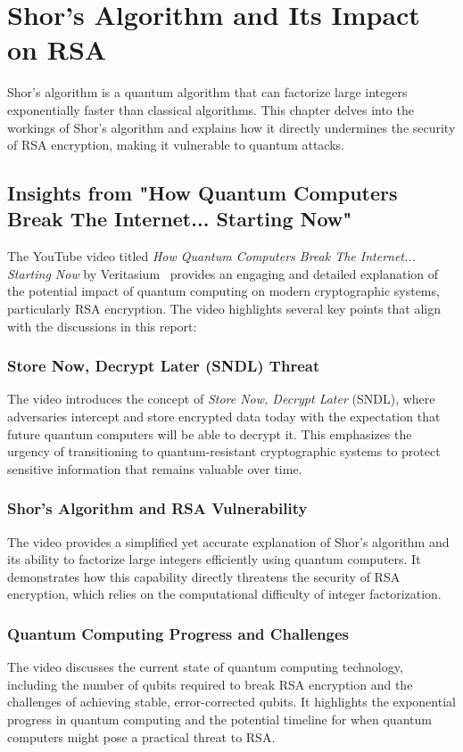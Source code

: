 \documentclass[12pt,a4paper]{report}
\begin{document}
\chapter{Shor's Algorithm and Its Impact on RSA}
\label{chap:shors_algorithm}
Shor's algorithm is a quantum algorithm that can factorize large integers exponentially faster than classical algorithms. This chapter delves into the workings of Shor's algorithm and explains how it directly undermines the security of RSA encryption, making it vulnerable to quantum attacks.

\section{Insights from "How Quantum Computers Break The Internet... Starting Now"}
The YouTube video titled \textit{How Quantum Computers Break The Internet... Starting Now} by Veritasium~\cite{VeritasiumVideo} provides an engaging and detailed explanation of the potential impact of quantum computing on modern cryptographic systems, particularly RSA encryption. The video highlights several key points that align with the discussions in this report:

\subsection{Store Now, Decrypt Later (SNDL) Threat}
The video introduces the concept of \textit{Store Now, Decrypt Later} (SNDL), where adversaries intercept and store encrypted data today with the expectation that future quantum computers will be able to decrypt it. This emphasizes the urgency of transitioning to quantum-resistant cryptographic systems to protect sensitive information that remains valuable over time.

\subsection{Shor's Algorithm and RSA Vulnerability}
The video provides a simplified yet accurate explanation of Shor's algorithm and its ability to factorize large integers efficiently using quantum computers. It demonstrates how this capability directly threatens the security of RSA encryption, which relies on the computational difficulty of integer factorization.

\subsection{Quantum Computing Progress and Challenges}
The video discusses the current state of quantum computing technology, including the number of qubits required to break RSA encryption and the challenges of achieving stable, error-corrected qubits. It highlights the exponential progress in quantum computing and the potential timeline for when quantum computers might pose a practical threat to RSA.
\end{document}
